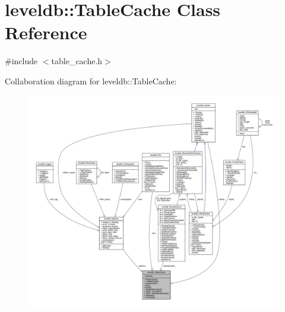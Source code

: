 \hypertarget{classleveldb_1_1_table_cache}{}\section{leveldb\+:\+:Table\+Cache Class Reference}
\label{classleveldb_1_1_table_cache}


{\ttfamily \#include $<$table\+\_\+cache.\+h$>$}



Collaboration diagram for leveldb\+:\+:Table\+Cache\+:
\nopagebreak
\begin{figure}[H]
\begin{center}
\leavevmode
\includegraphics[width=350pt]{classleveldb_1_1_table_cache__coll__graph}
\end{center}
\end{figure}
